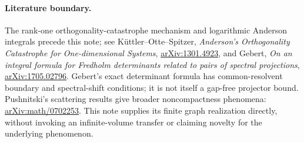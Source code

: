 \documentclass[11pt]{article}
\begin{document}
\paragraph{Literature boundary.}
The rank-one orthogonality-catastrophe mechanism and logarithmic
Anderson integrals precede this note; see K\"uttler--Otte--Spitzer,
\emph{Anderson's Orthogonality Catastrophe for One-dimensional Systems},
\href{https://arxiv.org/abs/1301.4923}{arXiv:1301.4923}, and
Gebert, \emph{On an integral formula for Fredholm determinants related
to pairs of spectral projections},
\href{https://arxiv.org/abs/1705.02796}{arXiv:1705.02796}.
Gebert's exact determinant formula has common-resolvent boundary and
spectral-shift conditions; it is not itself a gap-free projector bound.
Pushnitski's scattering results give broader noncompactness phenomena:
\href{https://arxiv.org/abs/math/0702253}{arXiv:math/0702253}.
This note supplies its finite graph realization directly, without
invoking an infinite-volume transfer or claiming novelty for the
underlying phenomenon.
\end{document}
